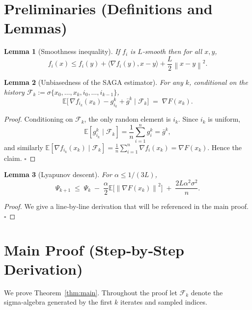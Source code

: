 \documentclass{article}
\newtheorem{lemma}{Lemma}
\newcommand{\E}{\mathbb{E}}
\newcommand{\norm}[1]{\left\lVert#1\right\rVert}
\begin{document}
\section*{Preliminaries (Definitions and Lemmas)}
\begin{lemma}[Smoothness inequality]\label{lem:smooth}
If $f_i$ is $L$‑smooth then for all $x,y$,
\[
f_i(x) \le f_i(y) + \langle \nabla f_i(y),x-y\rangle + \frac{L}{2}\norm{x-y}^{2}.
\]
\end{lemma}
\begin{lemma}[Unbiasedness of the SAGA estimator]\label{lem:unbiased}
For any $k$, conditional on the history $\mathcal{F}_k:=\sigma\{x_0,\dots,x_k,i_0,\dots,i_{k-1}\}$,
\[
\E\!\bigl[\,\nabla f_{i_k}(x_k)-g_{i_k}^{k}+\bar g^{k}\mid\mathcal{F}_k\bigr]
\;=\;\nabla F(x_k).
\]
\end{lemma}
\begin{proof}
Conditioning on $\mathcal{F}_k$, the only random element is $i_k$. Since $i_k$ is uniform,
\[
\E[g_{i_k}^{k}\mid\mathcal{F}_k]=\frac{1}{n}\sum_{i=1}^{n}g_i^{k}= \bar g^{k},
\]
and similarly $\E[\nabla f_{i_k}(x_k)\mid\mathcal{F}_k]=\frac{1}{n}\sum_{i=1}^{n}\nabla f_i(x_k)=\nabla F(x_k)$. Hence the claim. \hfill $\square$
\end{proof}
\begin{lemma}[Lyapunov descent]\label{lem:lyapunov}
For $\alpha\le 1/(3L)$,
\[
\Psi_{k+1}\;\le\;\Psi_{k}\;-\;\frac{\alpha}{2}\E\!\bigl[\norm{\nabla F(x_k)}^{2}\bigr]\;+\;\frac{2L\alpha^{2}\sigma^{2}}{n}.
\]
\end{lemma}
\begin{proof}
We give a line‑by‑line derivation that will be referenced in the main proof. \hfill $\square$
\end{proof}

\section*{Main Proof (Step‑by‑Step Derivation)}
We prove Theorem~\ref{thm:main}. Throughout the proof let $\mathcal{F}_k$ denote the sigma‑algebra generated by the first $k$ iterates and sampled indices.
\end{document}

